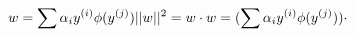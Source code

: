 \documentclass[10pt]{article}
\begin{document}
\[w = \sum\alpha_i y^{(i)} \phi (y^{(j)}) \\
||w||^2 = w \cdot w = (\sum\alpha_i y^{(i)} \phi (y^{(j)})) \cdot\]
\end{document}
